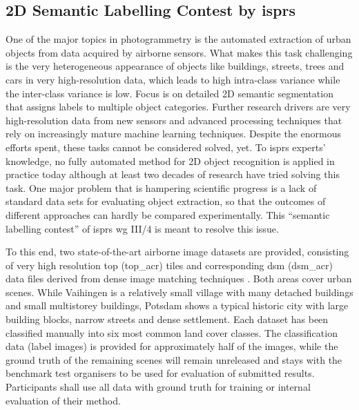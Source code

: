 \subsection{2D Semantic Labelling Contest by \acrfull{isprs}
\cite{isprs_semantic}}
One of the major topics in photogrammetry is the automated extraction of urban
objects from data acquired by airborne sensors. What makes this task
challenging is the very heterogeneous appearance of objects like buildings,
streets, trees and cars in very high-resolution data, which leads to high
intra-class variance while the inter-class variance is low. Focus is on
detailed 2D semantic segmentation that assigns labels to multiple object
categories. Further research drivers are very high-resolution data from new
sensors and advanced processing techniques that rely on increasingly mature
machine learning techniques. Despite the enormous efforts spent, these tasks
cannot be considered solved, yet. To \acrshort{isprs} experts' knowledge,
no fully automated method for 2D object recognition is applied in practice today
although at least two decades of research have tried solving this task. One
major problem that is hampering scientific progress is a lack of standard data
sets for evaluating object extraction, so that the outcomes of different
approaches can hardly be compared experimentally. This ``semantic labelling
contest'' of \acrshort{isprs} \acrfull{wg} III/4 is meant to resolve this issue.


To this end, two state-of-the-art airborne image datasets are provided,
consisting of very high resolution \gls{top} (\acrshort{top_acr}) tiles and
corresponding \gls{dsm} (\acrshort{dsm_acr}) data files derived from dense
image matching techniques \cite{rottensteiner2014results}. Both areas cover
urban scenes. While Vaihingen is a relatively small village with many detached
buildings and small multistorey buildings, Potsdam shows a typical historic
city with large building blocks, narrow streets and dense settlement.
Each dataset has been classified manually into six most common land cover
classes. The classification data (label images) is provided for approximately
half of the images, while the ground truth of the remaining scenes will
remain unreleased and stays with the benchmark test organisers to be used for
evaluation of submitted results. Participants shall use all data with ground
truth for training or internal evaluation of their method.


